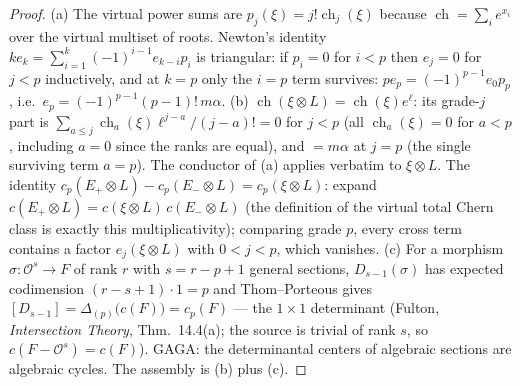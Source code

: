 \documentclass[11pt]{article}
\newcommand{\Oo}{\mathcal O}
\newcommand{\ch}{\operatorname{ch}}
\begin{document}
\begin{proof}
(a) The virtual power sums are $p_j(\xi)=j!\ch_j(\xi)$ because
$\ch=\sum_i e^{x_i}$ over the virtual multiset of roots. Newton's
identity $ke_k=\sum_{i=1}^k(-1)^{i-1}e_{k-i}p_i$ is triangular: if
$p_i=0$ for $i<p$ then $e_j=0$ for $j<p$ inductively, and at $k=p$
only the $i=p$ term survives:
$pe_p=(-1)^{p-1}e_0p_p$, i.e.\
$e_p=(-1)^{p-1}(p-1)!\,m\alpha$. (b)
$\ch(\xi\otimes L)=\ch(\xi)e^\ell$: its grade-$j$ part is
$\sum_{a\le j}\ch_a(\xi)\ell^{j-a}/(j-a)!=0$ for $j<p$ (all
$\ch_a(\xi)=0$ for $a<p$, including $a=0$ since the ranks are equal),
and $=m\alpha$ at $j=p$ (the single surviving term $a=p$). The
conductor of (a) applies verbatim to $\xi\otimes L$. The identity
$c_p(E_+\otimes L)-c_p(E_-\otimes L)=c_p(\xi\otimes L)$: expand
$c(E_+\otimes L)=c(\xi\otimes L)\,c(E_-\otimes L)$ (the definition of
the virtual total Chern class is exactly this multiplicativity);
comparing grade $p$, every cross term contains a factor
$e_j(\xi\otimes L)$ with $0<j<p$, which vanishes. (c) For a morphism
$\sigma\colon\Oo^s\to F$ of rank $r$ with $s=r-p+1$ general sections,
$D_{s-1}(\sigma)$ has expected codimension $(r-s+1)\cdot1=p$ and
Thom--Porteous gives
$[D_{s-1}]=\Delta_{(p)}\bigl(c(F)\bigr)=c_p(F)$ --- the $1\times1$
determinant (Fulton, \emph{Intersection Theory}, Thm.~14.4(a); the
source is trivial of rank $s$, so $c(F-\Oo^s)=c(F)$). GAGA: the
determinantal centers of algebraic sections are algebraic cycles. The
assembly is (b) plus (c).
\end{proof}
\end{document}
